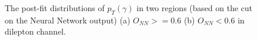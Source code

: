 \begin{figure}[ht]
  \centering
  \quad \quad
  \caption{The post-fit distributions of $p_T(\gamma)$ in two regions (based on the cut on the Neural Network output) (a) $O_{NN}>=0.6$ (b) $O_{NN}<0.6$ 
  in dilepton channel.}
  \label{fig:pt_postfit_dilep_realdata}
\end{figure}
\FloatBarrier



